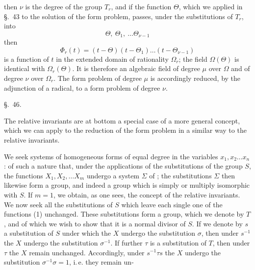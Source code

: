 then $\nu$ is the degree of the group $T_r$, and if the function $\Theta$, which
we applied in \S.\ 43 to the solution of the form problem,
passes, under the substitutions of $T_r$, into
\[ \Theta,\ \Theta_1,\ \ldots \Theta_{\nu-1} \]
then
\[ \Phi_r(t) = (t - \Theta)(t - \Theta_1) \ldots (t - \Theta_{\nu-1}) \]
is a function of $t$ in the extended domain of rationality
$\Omega_r$; the field $\Omega(\Theta)$ is identical with $\Omega_r(\Theta)$. It is therefore an algebraic field of degree $\mu$ over $\Omega$ and of degree $\nu$ over $\Omega_r$.
The form problem of degree $\mu$ is accordingly reduced, by the adjunction
of a radical, to a form problem of degree $\nu$.

\begin{center}
\S.\ 46.

\end{center}

The relative invariants are at bottom a special case
of a more general concept, which we can apply to the reduction
of the form problem in a similar way to the relative
invariants.

We seek systems of homogeneous forms of equal
degree in the variables $x_1, x_2 \ldots x_n$:
of such a nature that, under the applications of the substitutions of the group $S$, the functions $X_1, X_2, \ldots X_m$ undergo a
system $\Sigma$ of ; the substitutions $\Sigma$ then likewise form a group, and indeed
a group which is simply or multiply isomorphic with $S$. If
$m = 1$, we obtain, as one sees, the concept of the relative
invariants. We now seek all the substitutions of $S$ which
leave each single one of the functions (1) unchanged. These substitutions form a group, which we denote by $T$, and
of which we wish to show that it is a normal divisor of
$S$. If we denote by $s$ a substitution of $S$ under which
the $X$ undergo the substitution $\sigma$, then under $s^{-1}$ the $X$ undergo
the substitution $\sigma^{-1}$. If further $\tau$ is a substitution of $T$,
then under $\tau$ the $X$ remain unchanged. Accordingly, under
$s^{-1}\tau s$ the $X$ undergo the substitution $\sigma^{-1}\sigma = 1$, i.\,e. they remain un-
